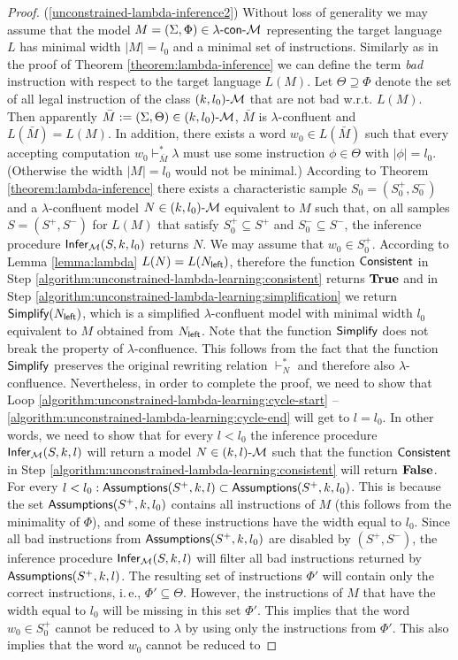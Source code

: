\begin{proof}
\noindent(\ref{unconstrained-lambda-inference2}) Without loss of generality we may assume that the model $M = (\Sigma, \Phi) \in \textup{\sf $\lambda$-con-\textup{\sf $\mathcal{M}$}}$ representing the target language $L$ has minimal width $|M| = l_0$ and a minimal set of instructions. Similarly as in the proof of Theorem \ref{theorem:lambda-inference} we can define the term \emph{bad} instruction with respect to the target language $L(M)$. Let $\Theta \supseteq \Phi$ denote the set of all legal instruction of the class $\textup{\sf $(k,l_0)$-\textup{\sf $\mathcal{M}$}}$ that are not bad w.r.t. $L(M)$. Then apparently $\bar{M} := (\Sigma, \Theta) \in \textup{\sf $(k,l_0)$-\textup{\sf $\mathcal{M}$}}$, $\bar{M}$ is $\lambda$-confluent and $L(\bar{M}) = L(M)$. In addition, there exists a word $w_0 \in L(\bar{M})$ such that every accepting computation $w_0 \vdash_{\bar{M}}^* \lambda$ must use some instruction $\phi \in \Theta$ with $|\phi| = l_0$. (Otherwise the width $|M| = l_0$ would not be minimal.) According to Theorem \ref{theorem:lambda-inference} there exists a characteristic sample $S_0 = (S_0^+, S_0^-)$ and a $\lambda$-confluent model $N \in \textup{\sf $(k,l_0)$-\textup{\sf $\mathcal{M}$}}$ equivalent to $M$ such that, on all samples $S = (S^+, S^-)$ for $L(M)$ that satisfy $S_0^+ \subseteq S^+$ and $S_0^- \subseteq S^-$, the inference procedure $\textup{\sf Infer}_{\textup{\sf $\mathcal{M}$}}(S, k, l_0)$ returns $N$. We may assume that $w_0 \in S_0^+$. According to Lemma \ref{lemma:lambda} $L(N) = L(N_{\sf left})$, therefore the function $\textup{\sf Consistent}$ in Step \ref{algorithm:unconstrained-lambda-learning:consistent} returns ${\bf True}$ and in Step \ref{algorithm:unconstrained-lambda-learning:simplification} we return $\textup{\sf Simplify}(N_{\sf left})$, which is a simplified $\lambda$-confluent model with minimal width $l_0$ equivalent to $M$ obtained from $N_{\sf left}$. Note that the function $\textup{\sf Simplify}$ does not break the property of $\lambda$-confluence. This follows from the fact that the function $\textup{\sf Simplify}$ preserves the original rewriting relation $\vdash_N^*$ and therefore also $\lambda$-confluence. Nevertheless, in order to complete the proof, we need to show that Loop \ref{algorithm:unconstrained-lambda-learning:cycle-start} -- \ref{algorithm:unconstrained-lambda-learning:cycle-end} will get to $l = l_0$. In other words, we need to show that for every $l < l_0$ the inference procedure $\textup{\sf Infer}_{\textup{\sf $\mathcal{M}$}}(S, k, l)$ will return a model $N \in \textup{\sf $(k,l)$-\textup{\sf $\mathcal{M}$}}$ such that the function $\textup{\sf Consistent}$ in Step \ref{algorithm:unconstrained-lambda-learning:consistent} will return ${\bf False}$. For every $l < l_0: \textup{\sf Assumptions}(S^+, k, l) \subset \textup{\sf Assumptions}(S^+, k, l_0)$. This is because the set $\textup{\sf Assumptions}(S^+, k, l_0)$ contains all instructions of $M$ (this follows from the minimality of $\Phi$), and some of these instructions have the width equal to $l_0$. Since all bad instructions from $\textup{\sf Assumptions}(S^+, k, l_0)$ are disabled by $(S^+, S^-)$, the inference procedure $\textup{\sf Infer}_{\textup{\sf $\mathcal{M}$}}(S, k, l)$ will filter all bad instructions returned by $\textup{\sf Assumptions}(S^+, k, l)$. The resulting set of instructions $\Phi'$ will contain only the correct instructions, i.\,e., $\Phi' \subseteq \Theta$. However, the instructions of $M$ that have the width equal to $l_0$ will be missing in this set $\Phi'$. This implies that the word $w_0 \in S_0^+$ cannot be reduced to $\lambda$ by using only the instructions from $\Phi'$. This also implies that the word $w_0$ cannot be reduced to 
\end{proof}
